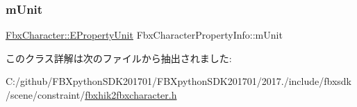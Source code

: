 \subsubsection{\texorpdfstring{m\+Unit}{mUnit}}
{\footnotesize\ttfamily \hyperlink{class_fbx_character_aa48fb13a1c63e6a69ce9fa251993f8d5}{Fbx\+Character\+::\+E\+Property\+Unit} Fbx\+Character\+Property\+Info\+::m\+Unit}



このクラス詳解は次のファイルから抽出されました\+:\begin{DoxyCompactItemize}
\item 
C\+:/github/\+F\+B\+Xpython\+S\+D\+K201701/\+F\+B\+Xpython\+S\+D\+K201701/2017./include/fbxsdk/scene/constraint/\hyperlink{fbxhik2fbxcharacter_8h}{fbxhik2fbxcharacter.\+h}\end{DoxyCompactItemize}
